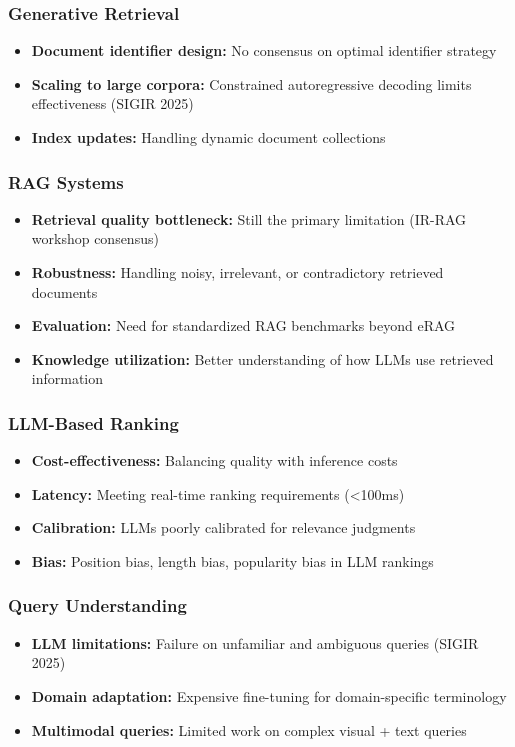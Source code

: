 \documentclass[11pt,letterpaper]{article}
\begin{document}
\subsubsection{Generative Retrieval}
\begin{itemize}[leftmargin=*]
    \item \textbf{Document identifier design:} No consensus on optimal identifier strategy
    \item \textbf{Scaling to large corpora:} Constrained autoregressive decoding limits effectiveness (SIGIR 2025)
    \item \textbf{Index updates:} Handling dynamic document collections
\end{itemize}

\subsubsection{RAG Systems}
\begin{itemize}[leftmargin=*]
    \item \textbf{Retrieval quality bottleneck:} Still the primary limitation (IR-RAG workshop consensus)
    \item \textbf{Robustness:} Handling noisy, irrelevant, or contradictory retrieved documents
    \item \textbf{Evaluation:} Need for standardized RAG benchmarks beyond eRAG
    \item \textbf{Knowledge utilization:} Better understanding of how LLMs use retrieved information
\end{itemize}

\subsubsection{LLM-Based Ranking}
\begin{itemize}[leftmargin=*]
    \item \textbf{Cost-effectiveness:} Balancing quality with inference costs
    \item \textbf{Latency:} Meeting real-time ranking requirements (<100ms)
    \item \textbf{Calibration:} LLMs poorly calibrated for relevance judgments
    \item \textbf{Bias:} Position bias, length bias, popularity bias in LLM rankings
\end{itemize}

\subsubsection{Query Understanding}
\begin{itemize}[leftmargin=*]
    \item \textbf{LLM limitations:} Failure on unfamiliar and ambiguous queries (SIGIR 2025)
    \item \textbf{Domain adaptation:} Expensive fine-tuning for domain-specific terminology
    \item \textbf{Multimodal queries:} Limited work on complex visual + text queries
\end{itemize}
\end{document}
